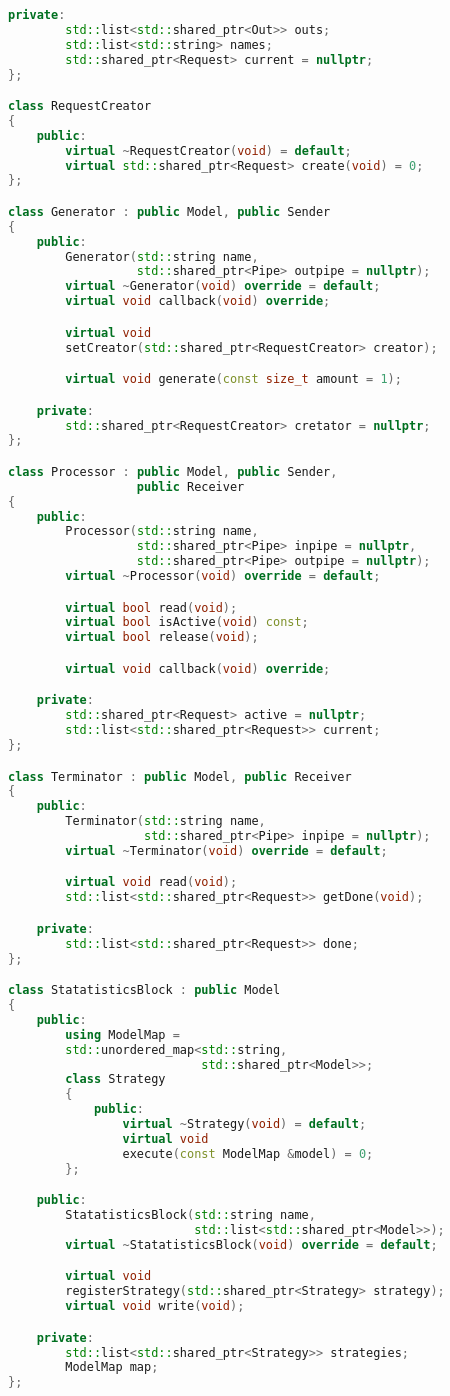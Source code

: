 \begin{lstlisting}[caption={Реализация элементов системы}, language=c++]
    private:
        std::list<std::shared_ptr<Out>> outs;
        std::list<std::string> names;
        std::shared_ptr<Request> current = nullptr;
};

class RequestCreator
{
    public:
        virtual ~RequestCreator(void) = default;
        virtual std::shared_ptr<Request> create(void) = 0;
};

class Generator : public Model, public Sender
{
    public:
        Generator(std::string name,
                  std::shared_ptr<Pipe> outpipe = nullptr);
        virtual ~Generator(void) override = default;
        virtual void callback(void) override;

        virtual void
        setCreator(std::shared_ptr<RequestCreator> creator);

        virtual void generate(const size_t amount = 1);

    private:
        std::shared_ptr<RequestCreator> cretator = nullptr;
};

class Processor : public Model, public Sender,
                  public Receiver
{
    public:
        Processor(std::string name,
                  std::shared_ptr<Pipe> inpipe = nullptr,
                  std::shared_ptr<Pipe> outpipe = nullptr);
        virtual ~Processor(void) override = default;

        virtual bool read(void);
        virtual bool isActive(void) const;
        virtual bool release(void);

        virtual void callback(void) override;

    private:
        std::shared_ptr<Request> active = nullptr;
        std::list<std::shared_ptr<Request>> current;
};

class Terminator : public Model, public Receiver
{
    public:
        Terminator(std::string name,
                   std::shared_ptr<Pipe> inpipe = nullptr);
        virtual ~Terminator(void) override = default;

        virtual void read(void);
        std::list<std::shared_ptr<Request>> getDone(void);

    private:
        std::list<std::shared_ptr<Request>> done;
};

class StatatisticsBlock : public Model
{
    public:
        using ModelMap = 
        std::unordered_map<std::string,
                           std::shared_ptr<Model>>;
        class Strategy
        {
            public:
                virtual ~Strategy(void) = default;
                virtual void
                execute(const ModelMap &model) = 0;
        };

    public:
        StatatisticsBlock(std::string name,
                          std::list<std::shared_ptr<Model>>);
        virtual ~StatatisticsBlock(void) override = default;

        virtual void
        registerStrategy(std::shared_ptr<Strategy> strategy);
        virtual void write(void);

    private:
        std::list<std::shared_ptr<Strategy>> strategies;
        ModelMap map;
};
\end{lstlisting}

